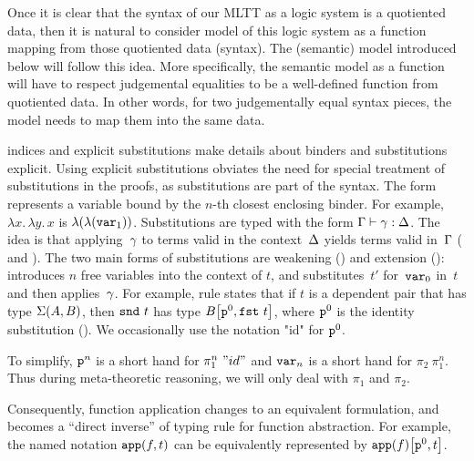 Once it is clear that the syntax of our MLTT as a logic system is a quotiented 
data, then it is natural to consider model of this logic system 
as a function mapping from those quotiented data (syntax). The (semantic) model introduced below 
will follow this idea. More specifically, the semantic model as a function will have to respect 
judgemental equalities to be a well-defined function from quotiented data. In other words,
for two judgementally equal syntax pieces, the model needs to map them into the same data.  




 indices and explicit substitutions make details about
binders and substitutions explicit.
%
Using explicit substitutions obviates the need for special treatment of
substitutions in the proofs, as substitutions are part of the syntax.
%
The form  represents a variable bound by the $n$-th closest enclosing binder.
For example, $\lambda x.\,\lambda y.\,x$ is $\lambda({\lambda({\texttt{var}_{1}})})$.
%
Substitutions are typed with the form 
$ {\Gamma} \vdash {\ensuremath{\gamma}} : {\Delta} $.
The idea is that applying~$\gamma$ to terms valid in the context~$\Delta$
yields terms valid in~$\Gamma$ ( and ).
%
The two main forms of substitutions are weakening () and extension ():
 introduces $n$ free variables into the context of $t$, and
 substitutes~$t'$ for~$\texttt{var}_{0}$ in~$t$ and
then applies~$\gamma$.
For example, rule  states that if $t$ is a dependent pair
that has type $\Sigma({A},{B})$, then $\texttt{snd}~{t}$ has type
${B}\!\left[{{\texttt{p}^{0}},{\texttt{fst}~{t}}}\right]$,
where $\texttt{p}^{0}$ is the identity substitution ().
We occasionally use the notation "id" for $\texttt{p}^{0}$.

To simplify, $\texttt{p}^{n}$ is a short hand for $\pi_1^n~"id"$ and $\texttt{var}_{n}$ is a short hand for $\pi_2~\pi_1^{n}$. Thus during meta-theoretic reasoning, we will only deal with $\pi_1$ and $\pi_2$.

Consequently, function application changes to an equivalent formulation, and becomes a ``direct inverse'' of typing rule for function abstraction. For example, the named notation $\texttt{app}({f},{t})$ can be equivalently represented by ${\texttt{app}({f})}\!\left[{{\texttt{p}^{0}},{t}}\right]$.

